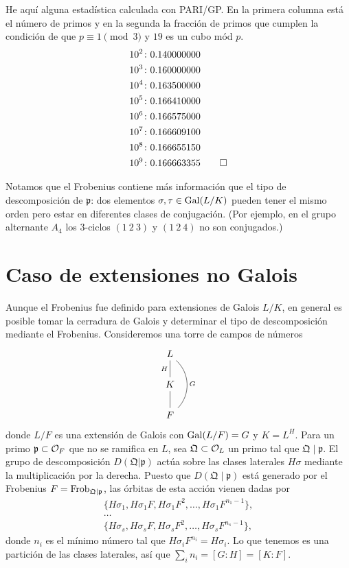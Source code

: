 \begin{ejemplo}
  He aquí alguna estadística calculada con PARI/GP. En la primera columna está
  el número de primos y en la segunda la fracción de primos que cumplen la
  condición de que $p \equiv 1 \pmod{3}$ y $19$ es un cubo mód $p$.
  \begin{align*}
    10^2\colon & 0.140000000 \\
    10^3\colon & 0.160000000 \\
    10^4\colon & 0.163500000 \\
    10^5\colon & 0.166410000 \\
    10^6\colon & 0.166575000 \\
    10^7\colon & 0.166609100 \\
    10^8\colon & 0.166655150 \\
    10^9\colon & 0.166663355 \qedhere
  \end{align*}
\end{ejemplo}

Notamos que el Frobenius contiene más información que el tipo de descomposición
de $\mathfrak{p}$: dos elementos $\sigma,\tau\in \operatorname{Gal} (L/K)$ pueden tener el
mismo orden pero estar en diferentes clases de conjugación. (Por ejemplo, en el
grupo alternante $A_4$ los $3$-ciclos $(1~2~3)$ y $(1~2~4)$ no son conjugados.)


\section{Caso de extensiones no Galois}

Aunque el Frobenius fue definido para extensiones de Galois $L/K$, en general es
posible tomar la cerradura de Galois y determinar el tipo de descomposición
mediante el Frobenius. Consideremos una torre de campos de números
\[ \begin{tikzcd}
  L\ar[-]{d}[swap]{H}\ar[-,bend left=45]{dd}{G} \\
  K\ar[-]{d} \\
  F
\end{tikzcd} \]
donde $L/F$ es una extensión de Galois con $\operatorname{Gal} (L/F) = G$ y $K = L^H$.
Para un primo $\mathfrak{p} \subset \mathcal{O}_F$ que no se ramifica en $L$, sea
$\mathfrak{Q} \subset \mathcal{O}_L$ un primo tal que $\mathfrak{Q} \mid \mathfrak{p}$.
El grupo de descomposición $D (\mathfrak{Q}|\mathfrak{p})$ actúa sobre
las clases laterales $H\sigma$ mediante la multiplicación por la derecha.
Puesto que $D (\mathfrak{Q}\mid\mathfrak{p})$ está generado por el Frobenius
$F = \operatorname{Frob}_{\mathfrak{Q}|\mathfrak{p}}$, las órbitas de esta acción vienen
dadas por
\begin{gather*}
  \{ H \sigma_1, H \sigma_1 F, H \sigma_1 F^2, \ldots, H \sigma_1 F^{n_1 - 1} \}, \\
  \dots \\
  \{ H \sigma_s, H \sigma_s F, H \sigma_s F^2, \ldots, H \sigma_s F^{n_s - 1} \},
\end{gather*}
donde $n_i$ es el mínimo número tal que $H \sigma_i F^{n_i} = H \sigma_i$.
Lo que tenemos es una partición de las clases laterales, así que
$\sum_i n_i = [G : H] = [K : F]$.

